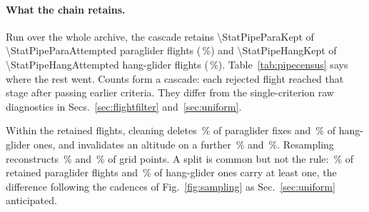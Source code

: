 \begin{flowblock}
\begin{revblock}
\paragraph{What the chain retains.}
Run over the whole archive, the cascade retains
\num{\StatPipeParaKept} of \num{\StatPipeParaAttempted} paraglider flights
(\StatPipeParaKeptPct\,\%) and \num{\StatPipeHangKept} of \num{\StatPipeHangAttempted}
hang-glider flights (\StatPipeHangKeptPct\,\%). Table~\ref{tab:pipecensus} says where the
rest went. Counts form a cascade: each rejected flight reached that stage after passing
earlier criteria. They differ from the single-criterion raw diagnostics in
Secs.~\ref{sec:flightfilter} and~\ref{sec:uniform}.

Within the retained flights, cleaning deletes \StatPipeParaRemovedPct\,\% of paraglider fixes and
\StatPipeHangRemovedPct\,\% of hang-glider ones, and invalidates an altitude on a further
\StatPipeParaAltInvalidPct\,\% and \StatPipeHangAltInvalidPct\,\%. 
Resampling reconstructs \StatPipeParaInterpPct\,\% and \StatPipeHangInterpPct\,\% of grid
points. A split is common but not the rule: \StatPipeParaSplitPct\,\% of retained
paraglider flights and \StatPipeHangSplitPct\,\% of hang-glider ones carry at least one,
the difference following the cadences of Fig.~\ref{fig:sampling} as
Sec.~\ref{sec:uniform} anticipated.
\end{revblock}


\end{flowblock}
